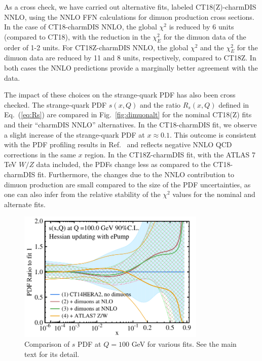 As a cross check, we have carried out alternative fits, labeled CT18(Z)-charmDIS NNLO, using the NNLO FFN calculations for dimuon production cross sections. 
In the case of CT18-charmDIS NNLO, the global $\chi^2$ is reduced by 6 units (compared to CT18), with the reduction in the $\chi^2_E$ for the dimuon data of the order of 1-2 units.
%
For CT18Z-charmDIS NNLO, the global $\chi^2$ and the $\chi^2_E$ for the dimuon data  are reduced by 11 and 8 units, respectively, compared to CT18Z.
In both cases the NNLO predictions  provide a marginally better agreement with the data. 

The impact of these choices  on the strange-quark PDF has also been cross checked. The strange-quark PDF $s(x,Q)$ and the ratio $R_s(x,Q)$ defined in Eq.~(\ref{eq:Rs}) are compared in
Fig.~\ref{fig:dimuonalt} for the nominal CT18(Z) fits and their ``charmDIS NNLO'' alternatives. 
%
In the
CT18-charmDIS fit, we observe a slight increase of the strange-quark PDF at $x\! \approx\! 0.1$. This outcome is consistent with the PDF profiling results in Ref.~\cite{Gao:2017kkx} and reflects negative NNLO QCD corrections in the same $x$ region. In the CT18Z-charmDIS fit, with the ATLAS 7 TeV
$W/Z$ data included, the PDFs change less as compared to the CT18-charmDIS fit.
%
Furthermore, the changes due to the NNLO contribution to dimuon production are small compared to the size of the PDF uncertainties, as one
can also infer from the relative stability of the $\chi^2$ values for the nominal and alternate fits.
%


\begin{figure}[htbp]
	\includegraphics[width=0.8\textwidth]{./fig/pdfs_CT14HERA2dimuons.pdf}
	\caption{\label{fig:epump-dimuon}
		Comparison of $s$ PDF at $Q=100$ GeV for various fits. See the main text for its detail. }
\end{figure}

